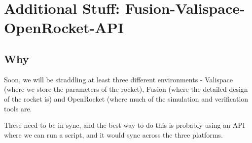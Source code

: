 \documentclass[12pt]{article}
\begin{document}
\section{Additional Stuff: Fusion-Valispace-OpenRocket-API}

\subsection{Why}

Soon, we will be straddling at least three different environments - Valispace (where we store the parameters of the rocket), Fusion (where the detailed design of the rocket is) and OpenRocket (where much of the simulation and verification tools are. 

These need to be in sync, and the best way to do this is probably using an API where we can run a script, and it would sync across the three platforms. 
\end{document}
